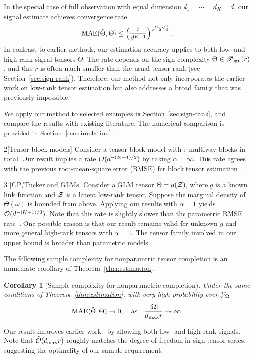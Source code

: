 \documentclass{article}
\theoremstyle{plain}
\newtheorem{cor}{Corollary}
\theoremstyle{definition}
\def\caliP{\mathscr{P}_{\textup{sgn}}}
\begin{document}
In the special case of full observation with equal dimension $d_1=\cdots=d_K=d$, our signal estimate achieves convergence rate
\begin{equation}
\textup{MAE}(\hat \Theta, \Theta)\leq \left(r\over d^{K-1}\right)^{{\alpha \over \alpha+2} \vee {1\over 2}}.
\end{equation}
In contrast to earlier methods, our estimation accuracy applies to both low- and high-rank signal tensors $\Theta$. The rate depends on the sign complexity $\Theta\in\caliP(r)$, and this $r$ is often much smaller than the usual tensor rank (see Section~\ref{sec:sign-rank}). Therefore, our method not only incorporates the earlier work on low-rank tensor estimation but also addresses a broad family that was previously impossible. 

We apply our method to selected examples in Section~\ref{sec:sign-rank}, and compare the results with existing literature. The numerical comparison is provided in Section~\ref{sec:simulation}. 
\begin{customexample}{2}[Tensor block models]
Consider a tensor block model with $r$ multiway blocks in total. Our result implies a rate $\mathcal{O}(d^{-(K-1)/2})$ by taking $\alpha=\infty$. This rate agrees with the  previous root-mean-square error (RMSE) for block tensor estimation~\cite{wang2019multiway}.
\end{customexample}

\begin{customexample}{3} [CP/Tucker and GLMs] 
Consider a GLM tensor $\Theta=g(\mathcal{Z})$, where $g$ is a known link function and $\mathcal{Z}$ is a latent low-rank tensor. Suppose the marginal density of $\Theta(\omega)$ is bounded from above. Applying our results with $\alpha=1$ yields $\mathcal{O}(d^{-(K-1)/3})$. Note that this rate is slightly slower than the parametric RMSE rate~\cite{zhang2018tensor,wang2018learning}. One possible reason is that our result remains valid for unknown $g$ and more general high-rank tensors with $\alpha=1$. The tensor family involved in our upper bound is broader than parametric models. 
\end{customexample}

The following sample complexity for nonparamtric tensor completion is an immediate corollary of Theorem~\ref{thm:estimation}. 
\begin{cor}[Sample complexity for nonparametric completion] Under the same conditions of Theorem~\ref{thm:estimation}, with very high probability over $\mathcal{Y}_\Omega$, 
\[
\textup{MAE}(\hat \Theta, \Theta)\to 0, \quad \text{as}\quad {|\Omega|\over {d_{\max}} r}\to \infty.
\]
\end{cor}
Our result improves earlier work~\cite{ghadermarzy2019near,cai2019nonconvex} by allowing both low- and high-rank signals. Note that $\tilde {\mathcal{O}}(d_{\max}r)$ roughly matches the degree of freedom in sign tensor series, suggesting the optimality of our sample requirement. 
\end{document}
